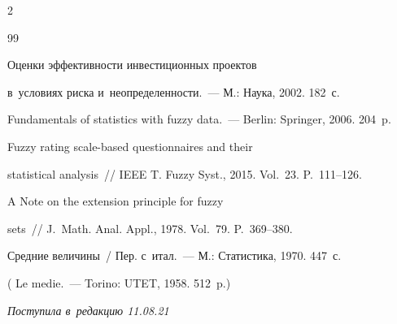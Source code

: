 \begin{multicols}{2}
{{\begin{thebibliography}{99}


 Оценки эффективности инвестиционных проектов 


в~условиях риска и~не\-оп\-ре\-де\-лен\-ности.~--- М.: Наука, 2002. 182~с.







 Fundamentals of statistics with fuzzy  data.~--- Berlin: Springer, 2006. 204~p.







 Fuzzy rating scale-based questionnaires and their 


statistical analysis~// IEEE T. Fuzzy Syst., 2015. Vol.~23. P.~111--126.







 A Note on the  extension  principle for fuzzy 


sets~// J.~Math. Anal. Appl., 1978. Vol.~79. P.~369--380.







 Средние величины~/ Пер. с~итал.~--- М.: Статистика, 1970. 447~с.


( {Le medie}.~--- Torino: UTET, 1958. 512~p.)





\end{thebibliography}





 }


 }





\end{multicols}





\vspace*{-9pt}





\hfill{\small\textit{Поступила в~редакцию 11.08.21}}





